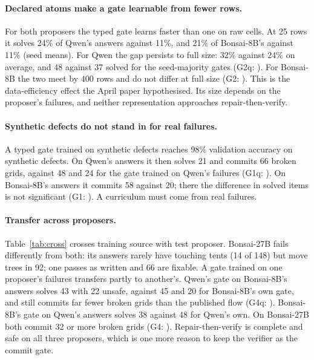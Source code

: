 \documentclass[11pt]{article}
\begin{document}
\paragraph{Declared atoms make a gate learnable from fewer rows.} For both proposers the typed gate learns faster than one on raw cells. At 25 rows it solves 24\% of Qwen's answers against 11\%, and 21\% of Bonsai-8B's against 11\% (seed means). For Qwen the gap persists to full size: 32\% against 24\% on average, and 48 against 37 solved for the seed-majority gates (G2q: \testGtwoq). For Bonsai-8B the two meet by 400 rows and do not differ at full size (G2: \testGtwo). This is the data-efficiency effect the April paper hypothesised. Its size depends on the proposer's failures, and neither representation approaches repair-then-verify.

\paragraph{Synthetic defects do not stand in for real failures.} A typed gate trained on synthetic defects reaches 98\% validation accuracy on synthetic defects. On Qwen's answers it then solves 21 and commits 66 broken grids, against 48 and 24 for the gate trained on Qwen's failures (G1q: \testGoneq). On Bonsai-8B's answers it commits 58 against 20; there the difference in solved items is not significant (G1: \testGone). A curriculum must come from real failures.

\paragraph{Transfer across proposers.} Table~\ref{tab:cross} crosses training source with test proposer. Bonsai-27B fails differently from both: its answers rarely have touching tents (14 of 148) but move trees in 92; one passes as written and 66 are fixable. A gate trained on one proposer's failures transfers partly to another's. Qwen's gate on Bonsai-8B's answers solves 43 with 22 unsafe, against 45 and 20 for Bonsai-8B's own gate, and still commits far fewer broken grids than the published flow (G4q: \testGfourq). Bonsai-8B's gate on Qwen's answers solves 38 against 48 for Qwen's own. On Bonsai-27B both commit 32 or more broken grids (G4: \testGfour). Repair-then-verify is complete and safe on all three proposers, which is one more reason to keep the verifier as the commit gate.

\begin{table}[t]
  \centering
  \small
  
  \caption{Typed gates by training source (rows) and test proposer (columns), seed-majority actions on 148 greedy test answers each.}
  \label{tab:cross}
\end{table}
\end{document}
